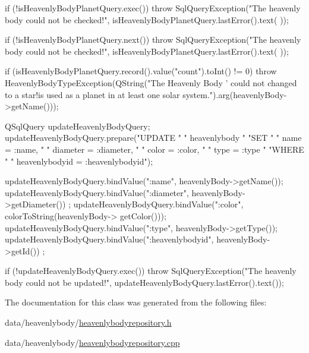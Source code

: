 \begin{DoxyCode}
{{        if (!isHeavenlyBodyPlanetQuery.exec())
        {
            throw SqlQueryException("The heavenly body could not be checked!",
                                    isHeavenlyBodyPlanetQuery.lastError().text(
      ));
        }

        if (!isHeavenlyBodyPlanetQuery.next())
        {
            throw SqlQueryException("The heavenly body could not be checked!",
                                    isHeavenlyBodyPlanetQuery.lastError().text(
      ));
        }

        if (isHeavenlyBodyPlanetQuery.record().value("count").toInt() != 0)
        {
            throw HeavenlyBodyTypeException(QString("The Heavenly Body '%
       could not changed to a star!\n\nIt is used as a planet in at least one solar
       system.").arg(heavenlyBody->getName()));
        }
    }

    QSqlQuery updateHeavenlyBodyQuery;
    updateHeavenlyBodyQuery.prepare("UPDATE "
                                    "     heavenlybody "
                                    "SET "
                                    "     name = :name, "
                                    "     diameter = :diameter, "
                                    "     color = :color, "
                                    "     type = :type "
                                    "WHERE "
                                    "     heavenlybodyid = :heavenlybodyid");

    updateHeavenlyBodyQuery.bindValue(":name", heavenlyBody->getName());
    updateHeavenlyBodyQuery.bindValue(":diameter", heavenlyBody->getDiameter())
      ;
    updateHeavenlyBodyQuery.bindValue(":color", colorToString(heavenlyBody->
      getColor()));
    updateHeavenlyBodyQuery.bindValue(":type", heavenlyBody->getType());
    updateHeavenlyBodyQuery.bindValue(":heavenlybodyid", heavenlyBody->getId())
      ;

    if (!updateHeavenlyBodyQuery.exec())
    {
        throw SqlQueryException("The heavenly body could not be updated!",
                                updateHeavenlyBodyQuery.lastError().text());
    }
}
\end{DoxyCode}


\-The documentation for this class was generated from the following files\-:\begin{DoxyCompactItemize}
\item 
data/heavenlybody/\hyperlink{heavenlybodyrepository_8h}{heavenlybodyrepository.\-h}\item 
data/heavenlybody/\hyperlink{heavenlybodyrepository_8cpp}{heavenlybodyrepository.\-cpp}\end{DoxyCompactItemize}
